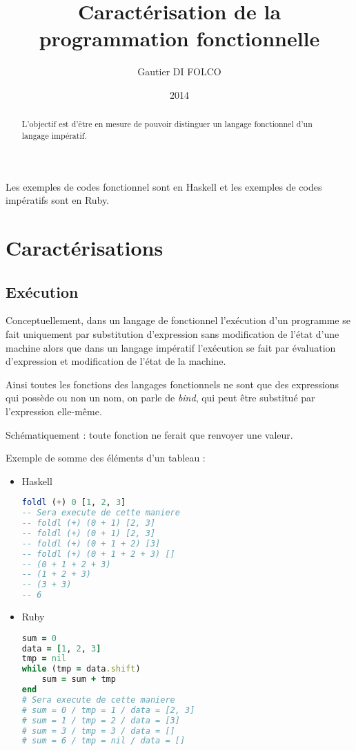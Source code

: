 \documentclass{article}
\title{Caractérisation de la programmation fonctionnelle}
\author{Gautier DI FOLCO}
\date{2014}
\begin{document}
\maketitle
\tableofcontents

\begin{abstract}
L'objectif est d'être en mesure de pouvoir distinguer un langage fonctionnel
d'un langage impératif.
\end{abstract}

Les exemples de codes fonctionnel sont en Haskell et les exemples de codes impératifs sont en Ruby.

\section{Caractérisations}
\subsection{Exécution}
Conceptuellement, dans un langage de fonctionnel l’exécution d’un programme se
fait uniquement par substitution d’expression sans modification de l’état d’une
machine alors que dans un langage impératif l’exécution se fait par évaluation
d’expression et modification de l’état de la machine.

Ainsi toutes les fonctions des langages fonctionnels ne sont que des expressions
qui possède ou non un nom, on parle de \emph{bind}, qui peut être substitué par
l'expression elle-même.

Schématiquement : toute fonction ne ferait que renvoyer une valeur.

Exemple de somme des éléments d'un tableau :

\begin{itemize}
    \item Haskell

\begin{lstlisting}[language=haskell]
foldl (+) 0 [1, 2, 3]
-- Sera execute de cette maniere
-- foldl (+) (0 + 1) [2, 3]
-- foldl (+) (0 + 1) [2, 3]
-- foldl (+) (0 + 1 + 2) [3]
-- foldl (+) (0 + 1 + 2 + 3) []
-- (0 + 1 + 2 + 3)
-- (1 + 2 + 3)
-- (3 + 3)
-- 6
\end{lstlisting}

    \item Ruby

\begin{lstlisting}[language=ruby]
sum = 0
data = [1, 2, 3]
tmp = nil
while (tmp = data.shift)
    sum = sum + tmp
end
# Sera execute de cette maniere
# sum = 0 / tmp = 1 / data = [2, 3]
# sum = 1 / tmp = 2 / data = [3]
# sum = 3 / tmp = 3 / data = []
# sum = 6 / tmp = nil / data = []
\end{lstlisting}
\end{itemize}
\end{document}
